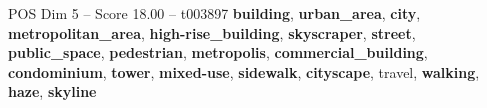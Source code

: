 \begin{textsample}{POS Dim 5 – Score 18.00 – t003897}  \label{ex:f5_pos_017}
\textbf{building}, \textbf{urban\_area}, \textbf{city}, \textbf{metropolitan\_area}, \textbf{high-rise\_building}, \textbf{skyscraper}, \textbf{street}, \textbf{public\_space}, \textbf{pedestrian}, \textbf{metropolis}, \textbf{commercial\_building}, \textbf{condominium}, \textbf{tower}, \textbf{mixed-use}, \textbf{sidewalk}, \textbf{cityscape}, travel, \textbf{walking}, \textbf{haze}, \textbf{skyline}

\end{textsample}
